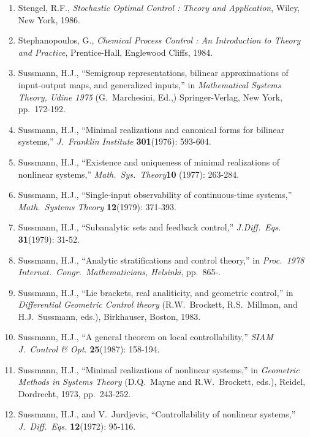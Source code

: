 \begin{enumerate}
\item
Stengel, R.F., {\it Stochastic Optimal Control : Theory and Application},
Wiley, New York, 1986.

\item
Stephanopoulos, G., {\it Chemical Process Control : An Introduction to Theory
and Practice}, Prentice-Hall, Englewood Cliffs, 1984.

\item
Sussmann, H.J., ``Semigroup representations, bilinear approximations of
input-output maps, and generalized inputs,'' in {\it Mathematical Systems
Theory, Udine 1975} (G.\ Marchesini, Ed.,) Springer-Verlag, New York, pp.\
172-192.

\item
Sussmann, H.J., ``Minimal realizations and canonical forms for bilinear
systems,'' {\it J.\ Franklin Institute} {\bf 301}(1976): 593-604.

\item
Sussmann, H.J., ``Existence and uniqueness of minimal realizations of
nonlinear systems,'' {\it Math.\ Sys.\ Theory}{\bf 10} (1977): 263-284.

\item
Sussmann, H.J., ``Single-input observability of continuous-time systems,''
{\it Math.\ Systems Theory} {\bf 12}(1979): 371-393.

\item
Sussmann, H.J., ``Subanalytic sets and feedback control,'' {\it J.Diff.\ Eqs.}
{\bf 31}(1979): 31-52.

\item
Sussmann, H.J., ``Analytic stratifications and control theory,'' in {\it
Proc.\ 1978 Internat.\ Congr.\ Mathematicians, Helsinki}, pp.\ 865-\-871.

\item
Sussmann, H.J., ``Lie brackets, real analiticity, and geometric control,'' in
{\it Differential Geometric Control theory} (R.W.\ Brockett, R.S.\ Millman,
and H.J.\ Sussmann, eds.), Birkhauser, Boston, 1983.

\item
Sussmann, H.J., ``A general theorem on local controllability,'' {\it SIAM J.\
Control \& Opt.} {\bf 25}(1987): 158-194.

\item
Sussmann, H.J., ``Minimal realizations of nonlinear systems,'' in {\it
Geometric Methods in Systems Theory} (D.Q.\ Mayne and R.W.\ Brockett, eds.),
Reidel, Dordrecht, 1973, pp.\ 243-252.

\item
Sussmann, H.J., and V.\ Jurdjevic, ``Controllability of nonlinear systems,''
{\it J.\ Diff.\ Eqs.} {\bf 12}(1972): 95-116.


\end{enumerate}
